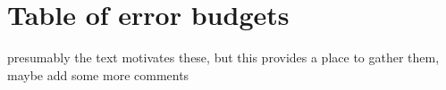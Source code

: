 \documentclass[12pt,preprint]{aastex}
\begin{document}
\section{Table of error budgets}

presumably the text motivates these, but this provides a place to
gather them, maybe add some more comments






\end{document}
